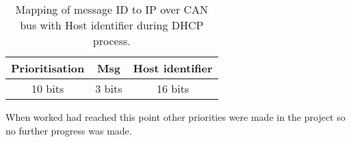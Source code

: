 \begin{table}[h]
\centering
    \caption{Mapping of message ID to IP over CAN bus with Host identifier
    during DHCP process.}
    \begin{tabular}{|c|c|c|} \hline
    \label{table:mapping_message_id_to_ip_host_identifier}
    Prioritisation & Msg & Host identifier \\ \hline
            10 bits & 3 bits & 16 bits\\ \hline
    \end{tabular}
\end{table}

When worked had reached this point other priorities were made in the project so no further progress
was made.
